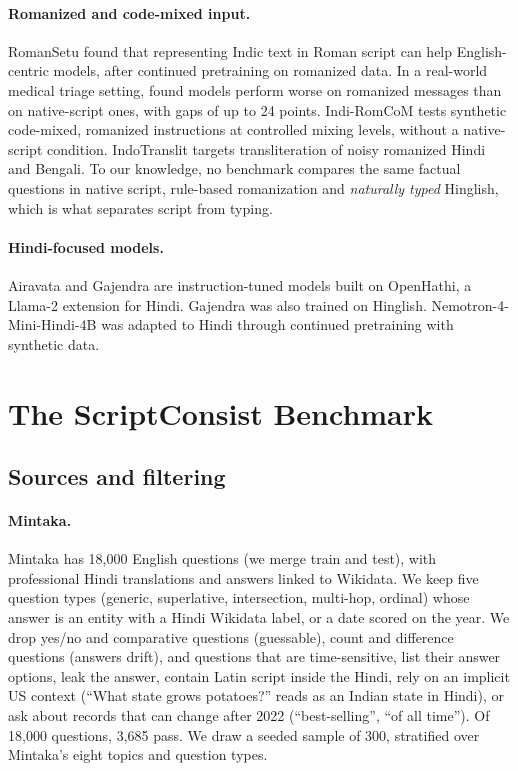 \documentclass[11pt]{article}
\begin{document}
\paragraph{Romanized and code-mixed input.}
RomanSetu \citep{husain2024romansetu} found that representing Indic text in Roman script can help English-centric models, after continued pretraining on romanized data.
In a real-world medical triage setting, \citet{khullar2025scriptgap} found models perform worse on romanized messages than on native-script ones, with gaps of up to 24 points.
Indi-RomCoM \citep{das2026indiromcom} tests synthetic code-mixed, romanized instructions at controlled mixing levels, without a native-script condition.
IndoTranslit \citep{gharami2025indotranslit} targets transliteration of noisy romanized Hindi and Bengali.
To our knowledge, no benchmark compares the same factual questions in native script, rule-based romanization and \emph{naturally typed} Hinglish, which is what separates script from typing.

\paragraph{Hindi-focused models.}
Airavata \citep{gala2024airavata} and Gajendra \citep{bhabha2024gajendra} are instruction-tuned models built on OpenHathi, a Llama-2 extension for Hindi. Gajendra was also trained on Hinglish.
Nemotron-4-Mini-Hindi-4B \citep{joshi2024nemotronhindi} was adapted to Hindi through continued pretraining with synthetic data.

\section{The ScriptConsist Benchmark}

\subsection{Sources and filtering}

\paragraph{Mintaka.}
Mintaka \citep{sen2022mintaka} has 18{,}000 English questions (we merge train and test), with professional Hindi translations and answers linked to Wikidata.
We keep five question types (generic, superlative, intersection, multi-hop, ordinal) whose answer is an entity with a Hindi Wikidata label, or a date scored on the year.
We drop yes/no and comparative questions (guessable), count and difference questions (answers drift), and questions that are time-sensitive, list their answer options, leak the answer, contain Latin script inside the Hindi, rely on an implicit US context (``What state grows potatoes?'' reads as an Indian state in Hindi), or ask about records that can change after 2022 (``best-selling'', ``of all time'').
Of 18{,}000 questions, 3{,}685 pass.
We draw a seeded sample of 300, stratified over Mintaka's eight topics and question types.
\end{document}
